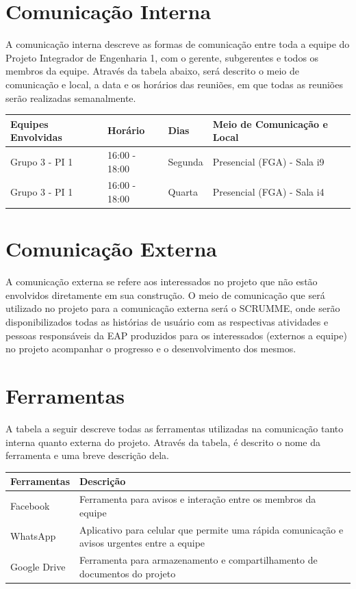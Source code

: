 \section{Comunicação Interna}

A comunicação interna descreve as formas de comunicação entre toda a equipe do Projeto Integrador de Engenharia 1, com o gerente, subgerentes e todos os membros da equipe. Através da tabela abaixo, será descrito o meio de comunicação e local, a data e os horários das reuniões, em que todas as reuniões serão realizadas semanalmente.

\begin{center}
    \begin{tabular}{| l | l | l | l |}
    \hline
Equipes Envolvidas	&	Horário	&	Dias	&	Meio de Comunicação e Local	\\ \hline
Grupo 3 - PI 1	&	16:00 - 18:00	&	Segunda	&	Presencial (FGA) - Sala i9	\\ \hline
Grupo 3 - PI 1	&	16:00 - 18:00	&	Quarta	&	Presencial (FGA) - Sala i4	\\

    \hline
    \end{tabular}
\end{center}

\section{Comunicação Externa}

A comunicação externa se refere aos interessados no projeto que não estão envolvidos diretamente em sua construção. O meio de comunicação que será utilizado no projeto para a comunicação externa será o SCRUMME, onde serão disponibilizados todas as histórias de usuário com as respectivas atividades e pessoas responsáveis da EAP produzidos para os interessados (externos a equipe) no projeto acompanhar o progresso e o desenvolvimento dos mesmos.

\section{Ferramentas}

A tabela a seguir descreve todas as ferramentas utilizadas na comunicação tanto interna quanto externa do projeto. Através da tabela, é descrito o nome da ferramenta e uma breve descrição dela.

\begin{center}
    \begin{tabular}{| l | l |}
    \hline
Ferramentas & Descrição \\ \hline
Facebook & Ferramenta para avisos e interação entre os membros da equipe	\\ \hline
WhatsApp & Aplicativo para celular que permite uma rápida comunicação
e avisos urgentes entre a equipe	\\ \hline
Google Drive & Ferramenta para armazenamento e compartilhamento de
 documentos do projeto \\
    \hline
    \end{tabular}
\end{center}

